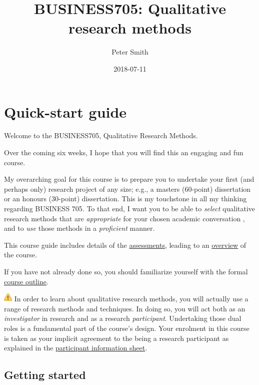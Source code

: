 \documentclass[]{book}
\title{BUSINESS705: Qualitative research methods}
\author{Peter Smith}
\date{2018-07-11}
\theoremstyle{definition}
\theoremstyle{definition}
\theoremstyle{definition}
\theoremstyle{remark}
\begin{document}
\maketitle

{
\setcounter{tocdepth}{1}
\tableofcontents
}
\hypertarget{quick-start-guide}{%
\chapter*{Quick-start guide}\label{quick-start-guide}}

Welcome to the BUSINESS705, Qualitative Research Methods.

Over the coming six weeks, I hope that you will find this an engaging
and fun course.

My overarching goal for this course is to prepare you to undertake your
first (and perhaps only) research project of any size; e.g., a masters
(60-point) dissertation or an honours (30-point) dissertation. This is
my touchstone in all my thinking regarding BUSINESS 705. To that end, I
want you to be able to \emph{select} qualitative research methods that
are \emph{appropriate} for your chosen academic conversation
\autocite{huff_2009_designingresearchpublication}, and to \emph{use}
those methods in a \emph{proficient} manner.

This course guide includes details of the
\protect\hyperlink{assessment-overview}{assessments}, leading to an
\protect\hyperlink{course-overview}{overview} of the course.

If you have not already done so, you should familiarize yourself with
the formal \protect\hyperlink{course-outline}{course outline}.

\includegraphics{images/warning.png} In order to learn about qualitative
research methods, you will actually use a range of research methods and
techniques. In doing so, you will act both as an \emph{investigator} in
research and as a research \emph{participant}. Undertaking those dual
roles is a fundamental part of the course's design. Your enrolment in
this course is taken as your implicit agreement to the being a research
participant as explained in the \protect\hyperlink{pis}{participant
information sheet}.

\hypertarget{getting-started}{%
\section*{Getting started}\label{getting-started}}
\end{document}
